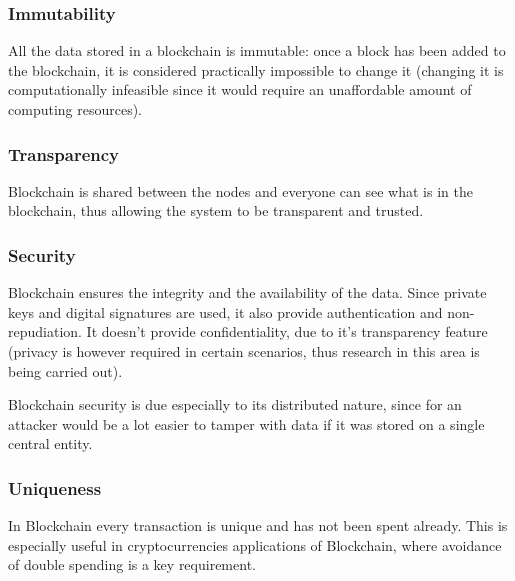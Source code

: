 \subsubsection*{Immutability}
All the data stored in a blockchain is immutable: once a block has been added to
the blockchain, it is considered practically impossible to change it (changing it
is computationally infeasible since it would require an unaffordable amount of
computing resources).

\subsubsection*{Transparency}
Blockchain is shared between the nodes and everyone can see what is in the
blockchain, thus allowing the system to be transparent and trusted.

\subsubsection*{Security}
Blockchain ensures the integrity and the availability of the data. Since
private keys and digital signatures are used, it also provide authentication and
non-repudiation. It doesn't provide confidentiality, due to it's transparency
feature (privacy is however required in certain scenarios, thus research in
this area is being carried out).

Blockchain security is due especially to its distributed nature, since for an
attacker would be a lot easier to tamper with data if it was stored on a single
central entity.

\subsubsection*{Uniqueness}
In Blockchain every transaction is unique and has not been spent already.
This is especially useful in cryptocurrencies applications of Blockchain,
where avoidance of double spending is a key requirement.















